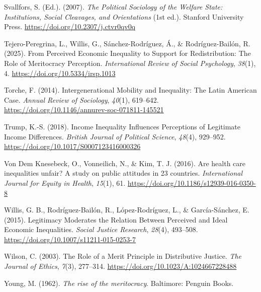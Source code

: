 \documentclass[
  12pt,
]{article}
\newlength{\cslhangindent}
\newenvironment{CSLReferences}[2] %
 {\begin{list}{}{%
  \setlength{\itemindent}{0pt}
  \setlength{\leftmargin}{0pt}
  \setlength{\parsep}{0pt}
  \ifodd #1
   \setlength{\leftmargin}{\cslhangindent}
   \setlength{\itemindent}{-1\cslhangindent}
  \fi
  \setlength{\itemsep}{#2\baselineskip}}}
 {\end{list}}
\begin{document}
\begin{CSLReferences}{1}{0}
Svallfors, S. (Ed.). (2007). \emph{The {Political Sociology} of the
{Welfare State}: {Institutions}, {Social Cleavages}, and {Orientations}}
(1st ed.). Stanford University Press.
\url{https://doi.org/10.2307/j.ctvr0qv0q}

Tejero-Peregrina, L., Willis, G., Sánchez-Rodríguez, Á., \&
Rodríguez-Bailón, R. (2025). From {Perceived Economic Inequality} to
{Support} for {Redistribution}: {The Role} of {Meritocracy Perception}.
\emph{International Review of Social Psychology}, \emph{38}(1), 4.
\url{https://doi.org/10.5334/irsp.1013}

Torche, F. (2014). Intergenerational {Mobility} and {Inequality}: {The
Latin American Case}. \emph{Annual Review of Sociology}, \emph{40}(1),
619--642. \url{https://doi.org/10.1146/annurev-soc-071811-145521}

Trump, K.-S. (2018). Income {Inequality Influences Perceptions} of
{Legitimate Income Differences}. \emph{British Journal of Political
Science}, \emph{48}(4), 929--952.
\url{https://doi.org/10.1017/S0007123416000326}

Von Dem Knesebeck, O., Vonneilich, N., \& Kim, T. J. (2016). Are health
care inequalities unfair? {A} study on public attitudes in 23 countries.
\emph{International Journal for Equity in Health}, \emph{15}(1), 61.
\url{https://doi.org/10.1186/s12939-016-0350-8}

Willis, G. B., Rodríguez-Bailón, R., López-Rodríguez, L., \&
García-Sánchez, E. (2015). Legitimacy {Moderates} the {Relation Between
Perceived} and {Ideal Economic Inequalities}. \emph{Social Justice
Research}, \emph{28}(4), 493--508.
\url{https://doi.org/10.1007/s11211-015-0253-7}

Wilson, C. (2003). The {Role} of a {Merit Principle} in {Distributive
Justice}. \emph{The Journal of Ethics}, \emph{7}(3), 277--314.
\url{https://doi.org/10.1023/A:1024667228488}

Young, M. (1962). \emph{The rise of the meritocracy}. Baltimore: Penguin
Books.

\end{CSLReferences}
\end{document}
